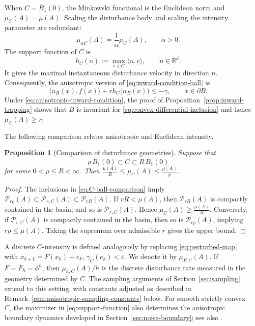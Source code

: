 \documentclass[pdflatex,sn-mathphys-num]{sn-jnl}
\numberwithin{equation}{section}
\theoremstyle{thmstyleone}%
\newtheorem{proposition}[theorem]{Proposition}
\theoremstyle{definition}
\theoremstyle{remark}
\begin{document}
When $C=\overline B_1(0)$, the Minkowski functional is the Euclidean norm and $\mu_C(A)=\mu(A)$. Scaling the disturbance body and scaling the intensity parameter are redundant:
\[
    \mu_{\alpha C}(A)
    =
    \frac1\alpha\mu_C(A),
    \qquad \alpha>0.
\]
The support function of $C$ is
\begin{equation}
\label{eq:support-function}
    h_C(n)
    :=
    \max_{c\in C}\langle n,c\rangle,
    \qquad n\in\mathbb R^d.
\end{equation}
It gives the maximal instantaneous disturbance velocity in direction $n$. Consequently, the anisotropic version of
\eqref{eq:inward-condition-ball} is
\begin{equation}
\label{eq:anisotropic-inward-condition}
    \langle n_B(x),f(x)\rangle
    +
    r h_C\bigl(n_B(x)\bigr)
    \leq-\gamma,
    \qquad x\in\partial B.
\end{equation}
Under \eqref{eq:anisotropic-inward-condition}, the proof of Proposition~\ref{prop:inward-trapping} shows that $B$ is invariant for \eqref{eq:convex-differential-inclusion} and hence $\mu_C(A)\geq r$.

The following comparison relates anisotropic and Euclidean intensity.

\begin{proposition}[Comparison of disturbance geometries]
\label{prop:C-intensity-comparison}
Suppose that
\begin{equation}
\label{eq:C-ball-comparison}
    \rho\,\overline B_1(0)
    \subset C
    \subset
    R\,\overline B_1(0)
\end{equation}
for some $0<\rho\leq R<\infty$. Then
    $\frac{\mu(A)}{R}
    \leq
    \mu_C(A)
    \leq
    \frac{\mu(A)}{\rho}$.
\end{proposition}

\begin{proof}
The inclusions in \eqref{eq:C-ball-comparison} imply
    $\mathcal P_{r\rho}(A)
    \subset
    \mathcal P_{r,C}(A)
    \subset
    \mathcal P_{rR}(A)$.
If $rR<\mu(A)$, then $\mathcal P_{rR}(A)$ is compactly contained in the basin, and so is $\mathcal P_{r,C}(A)$. Hence $\mu_C(A)\geq\frac{\mu(A)}{R}$. Conversely, if $\mathcal P_{r,C}(A)$ is compactly contained in the basin, then so is $\mathcal P_{r\rho}(A)$, implying $r\rho\leq\mu(A)$. Taking the supremum over admissible $r$ gives the upper bound.
\end{proof}

A discrete $C$-intensity is defined analogously by replacing \eqref{eq:perturbed-map} with $x_{k+1}=F(x_k)+e_k$, $\gamma_C(e_k)<\varepsilon$. We denote it by $\mu_{F,C}(A)$. If $F=F_h=\phi^h$, then $\mu_{h,C}(A)/h$ is the discrete disturbance rate measured in the geometry determined by $C$. The sampling arguments of Section~\ref{sec:sampling} extend to this setting, with constants adjusted as described in Remark~\ref{rem:anisotropic-sampling-constants} below. For
smooth strictly convex $C$, the maximizer in \eqref{eq:support-function} also determines the anisotropic boundary dynamics developed in Section~\ref{sec:noise-boundary}; see also \citep{kourliouros2026invariant}.
\end{document}
